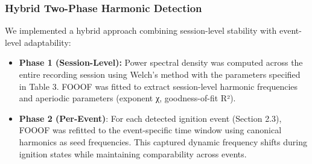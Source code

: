 \documentclass[11pt,a4paper]{article}
\begin{document}
\begin{table}[h]
    \centering
\end{table}

\subsubsection{Hybrid Two-Phase Harmonic Detection}
We implemented a hybrid approach combining session-level stability with event-level adaptability:

\begin{itemize}
    \item \textbf{Phase 1 (Session-Level):} Power spectral density was computed across the entire recording session using Welch's method with the parameters specified in Table 3. FOOOF was fitted to extract session-level harmonic frequencies and aperiodic parameters (exponent χ, goodness-of-fit R²).
    \item \textbf{Phase 2 (Per-Event)}: For each detected ignition event (Section 2.3), FOOOF was refitted to the event-specific time window using canonical harmonics as seed frequencies. This captured dynamic frequency shifts during ignition states while maintaining comparability across events.
\end{itemize}
\end{document}
